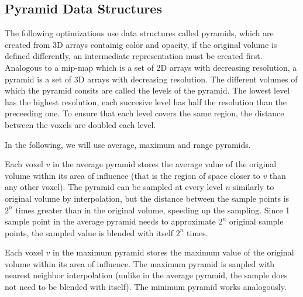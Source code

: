 {\subsection{Pyramid Data Structures}
The following optimizations use data structures called pyramids, which are created from 3D arrays containig color and opacity, if the original volume is defined differently, an intermediate representation must be created first.
Analogous to a mip-map which is a set of 2D arrays with decreasing resolution, a pyramid is a set of 3D arrays with decreasing resolution. The different volumes of which the pyramid consits are called the levels of the pyramid. The lowest level has the highest resolution, each succesive level has half the resolution than the preceeding one. To ensure that each level covers the same region, the distance between the voxels are doubled each level.

In the following, we will use average, maximum and range pyramids.

Each voxel $v$ in the average pyramid stores the average value of the original volume within its area of influence (that is the region of space closer to $v$ than any other voxel).
The pyramid can be sampled at every level $n$ similarly to original volume  by interpolation, but the distance between the sample points is $2^n$ times greater than in the original volume, speeding up the sampling.
Since 1 sample point in the average pyramid needs to approximate $2^n$ original sample points, the sampled value is blended with itself $2^n$ times.


Each voxel $v$ in the maximum pyramid stores the maximum value of the original volume within its area of influence.
The maximum pyramid is sanpled with nearest neighbor interpolation (unlike in the average pyramid, the sample does not need to be blended with itself).
The minimum pyramid works analogously.

}
